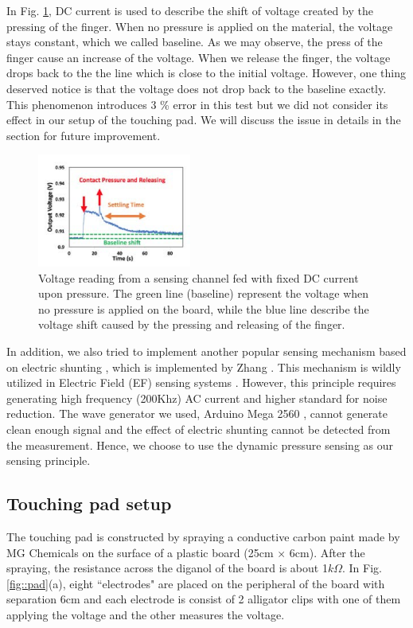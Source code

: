 \documentclass[reprint,amsmath, amsfonts, amssymb, aps, letterpaper]{revtex4-1}
\begin{document}
In Fig. \ref{fig::pressure}, DC current is used to describe the shift of voltage created by the pressing of the finger. When no pressure is applied on the material, the voltage stays constant, which we called baseline. As we may observe, the press of the finger cause an increase of the voltage. When we release the finger, the voltage drops back to the the line which is close to the initial voltage. However, one thing deserved notice is that the voltage does not drop back to the baseline exactly. This phenomenon introduces 3 \% error in this test but we did not consider its effect in our setup of the touching pad. We will discuss the issue in details in the section for future improvement.

\begin{figure}[h]
\centering
    \includegraphics[width=0.45\textwidth]{./figure/pressure}     
       \caption{Voltage reading from a sensing channel fed with fixed DC current upon pressure. The green line (baseline) represent the voltage when no pressure is applied on the board, while the blue line describe the voltage shift caused by the pressing and releasing of the finger. \citep{isoft} }
    \label{fig::pressure}
\end{figure}

In addition, we also tried to implement another popular sensing mechanism based on electric shunting \cite{shunt}, which is implemented by Zhang \cite{electrick}. This mechanism is wildly utilized in Electric Field (EF) sensing systems \cite{ef}. However, this principle requires generating high frequency (200Khz) AC current and higher standard for noise reduction. The wave generator we used, Arduino Mega 2560 \citep{arduino}, cannot generate clean enough signal and the effect of electric shunting cannot be detected from the measurement. Hence, we choose to use the dynamic pressure sensing as our sensing principle.
\subsection{Touching pad setup}
The touching pad is constructed by spraying a conductive carbon paint made by MG Chemicals \citep{carbon} on the surface of a plastic board (25cm $\times$ 6cm). After the spraying, the resistance across the diganol of the board is about 1$\si{k \Omega}$. In Fig. \ref{fig::pad}(a), eight ``electrodes" are placed on the peripheral of the board with separation 6cm and each electrode is consist of 2 alligator clips with one of them applying the voltage and the other measures the voltage. 
\end{document}
